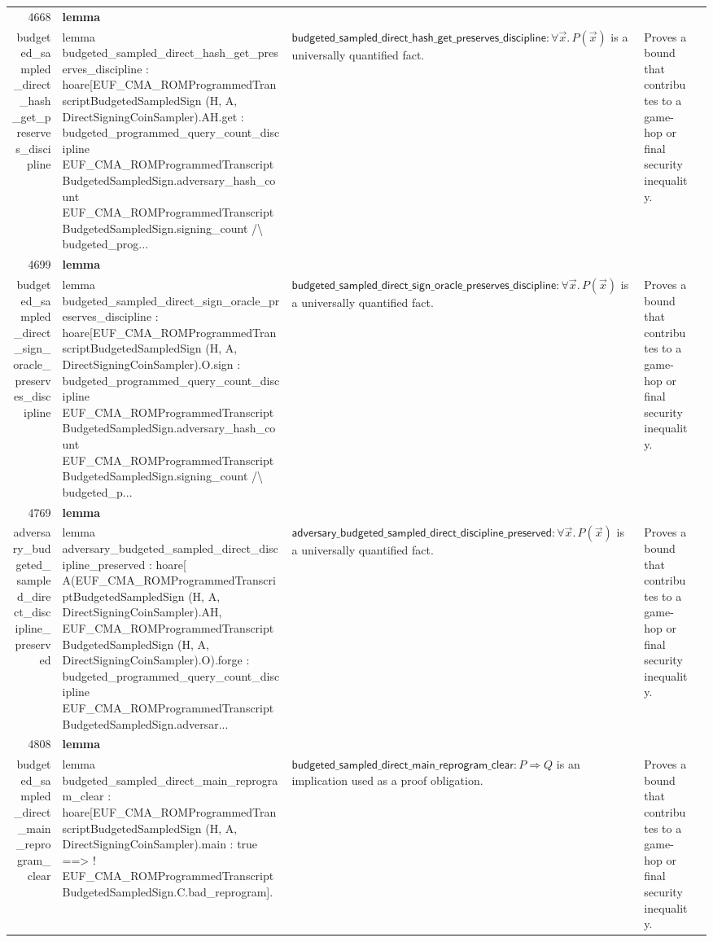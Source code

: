 \documentclass[10pt]{article}
\newcommand{\ec}[1]{\begingroup\ttfamily\scriptsize #1\endgroup}
\begin{document}
\begin{longtable}{r L{0.17\textwidth} L{0.26\textwidth} L{0.27\textwidth} L{0.20\textwidth}}
4668 & \textbf{lemma}\\\ec{budgeted\_sampled\_direct\_hash\_get\_preserves\_discipline} & \ec{lemma budgeted\_sampled\_direct\_hash\_get\_preserves\_discipline : hoare[EUF\_CMA\_ROMProgrammedTranscriptBudgetedSampledSign (H, A, DirectSigningCoinSampler).AH.get : budgeted\_programmed\_query\_count\_discipline EUF\_CMA\_ROMProgrammedTranscriptBudgetedSampledSign.adversary\_hash\_count EUF\_CMA\_ROMProgrammedTranscriptBudgetedSampledSign.signing\_count /\textbackslash{} budgeted\_prog...} & \(\mathsf{budgeted\_sampled\_direct\_hash\_get\_preserves\_discipline} : \forall \vec{x}.\, P(\vec{x})\) is a universally quantified fact. & Proves a bound that contributes to a game-hop or final security inequality. \\
4699 & \textbf{lemma}\\\ec{budgeted\_sampled\_direct\_sign\_oracle\_preserves\_discipline} & \ec{lemma budgeted\_sampled\_direct\_sign\_oracle\_preserves\_discipline : hoare[EUF\_CMA\_ROMProgrammedTranscriptBudgetedSampledSign (H, A, DirectSigningCoinSampler).O.sign : budgeted\_programmed\_query\_count\_discipline EUF\_CMA\_ROMProgrammedTranscriptBudgetedSampledSign.adversary\_hash\_count EUF\_CMA\_ROMProgrammedTranscriptBudgetedSampledSign.signing\_count /\textbackslash{} budgeted\_p...} & \(\mathsf{budgeted\_sampled\_direct\_sign\_oracle\_preserves\_discipline} : \forall \vec{x}.\, P(\vec{x})\) is a universally quantified fact. & Proves a bound that contributes to a game-hop or final security inequality. \\
4769 & \textbf{lemma}\\\ec{adversary\_budgeted\_sampled\_direct\_discipline\_preserved} & \ec{lemma adversary\_budgeted\_sampled\_direct\_discipline\_preserved : hoare[ A(EUF\_CMA\_ROMProgrammedTranscriptBudgetedSampledSign (H, A, DirectSigningCoinSampler).AH, EUF\_CMA\_ROMProgrammedTranscriptBudgetedSampledSign (H, A, DirectSigningCoinSampler).O).forge : budgeted\_programmed\_query\_count\_discipline EUF\_CMA\_ROMProgrammedTranscriptBudgetedSampledSign.adversar...} & \(\mathsf{adversary\_budgeted\_sampled\_direct\_discipline\_preserved} : \forall \vec{x}.\, P(\vec{x})\) is a universally quantified fact. & Proves a bound that contributes to a game-hop or final security inequality. \\
4808 & \textbf{lemma}\\\ec{budgeted\_sampled\_direct\_main\_reprogram\_clear} & \ec{lemma budgeted\_sampled\_direct\_main\_reprogram\_clear : hoare[EUF\_CMA\_ROMProgrammedTranscriptBudgetedSampledSign (H, A, DirectSigningCoinSampler).main : true ==> ! EUF\_CMA\_ROMProgrammedTranscriptBudgetedSampledSign.C.bad\_reprogram].} & \(\mathsf{budgeted\_sampled\_direct\_main\_reprogram\_clear} : P \Rightarrow Q\) is an implication used as a proof obligation. & Proves a bound that contributes to a game-hop or final security inequality. \\

\end{longtable}
\end{document}

